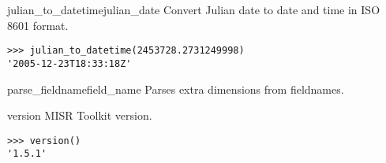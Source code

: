 \documentclass{howto}
\begin{document}
\begin{funcdesc}{julian_to_datetime}{julian_date}
    Convert Julian date to date and time in ISO 8601 format.

\begin{verbatim}
>>> julian_to_datetime(2453728.2731249998)
'2005-12-23T18:33:18Z'
\end{verbatim}
\end{funcdesc}

\begin{funcdesc}{parse_fieldname}{field_name}
    Parses extra dimensions from fieldnames.
\end{funcdesc}

\begin{funcdesc}{version}{}
    MISR Toolkit version.

\begin{verbatim}
>>> version()
'1.5.1'
\end{verbatim}
\end{funcdesc}
\end{document}
